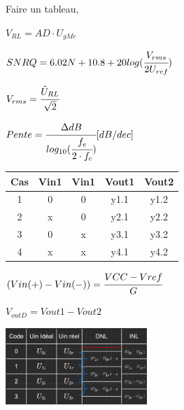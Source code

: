 

Faire un tableau,

$V_{RL} = AD \cdot U_{gMc}$

$SNRQ = 6.02N + 10.8 + 20log(\cfrac{V_{rms}}{2U_{ref}}) $

$V_{rms} = \cfrac{\hat{U}_{RL}}{\sqrt{2}} $

$Pente = \cfrac{\Delta dB}{log_{10}(\cfrac{f_e}{2\cdot f_c})}[dB/dec]$

\begin{tabular}{c|c|c|c|c}
    Cas & Vin1 & Vin1 & Vout1 & Vout2 \\\hline
    1 & 0 & 0 & y1.1 & y1.2 \\\hline
    2 & x & 0 & y2.1 & y2.2 \\\hline
    3 & 0 & x & y3.1 & y3.2 \\\hline
    4 & x & x & y4.1 & y4.2 \\
\end{tabular}

$(Vin(+)-Vin(-)) = \cfrac{VCC-Vref}{G}$

$V_{outD} = Vout1 - Vout2 $



\begin{center}
    \includegraphics[width = 0.4\textwidth]{img/Table.JPG}
\end{center}

